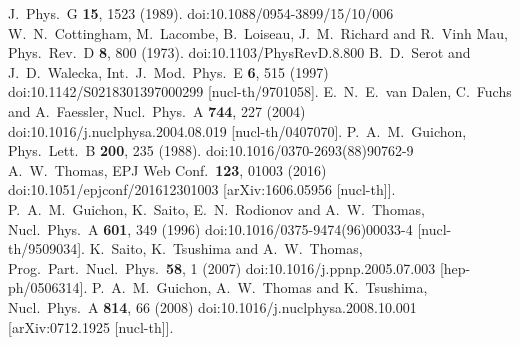 \documentclass{ws-ijmpe}
\begin{document}
\begin{thebibliography}{0}
  J.\ Phys.\ G {\bf 15}, 1523 (1989).
  doi:10.1088/0954-3899/15/10/006
%
  W.~N.~Cottingham, M.~Lacombe, B.~Loiseau, J.~M.~Richard and R.~Vinh Mau,
  Phys.\ Rev.\ D {\bf 8}, 800 (1973).
  doi:10.1103/PhysRevD.8.800
%
  B.~D.~Serot and J.~D.~Walecka,
  Int.\ J.\ Mod.\ Phys.\ E {\bf 6}, 515 (1997)
  doi:10.1142/S0218301397000299
  [nucl-th/9701058].
%
  E.~N.~E.~van Dalen, C.~Fuchs and A.~Faessler,
  Nucl.\ Phys.\ A {\bf 744}, 227 (2004)
  doi:10.1016/j.nuclphysa.2004.08.019
  [nucl-th/0407070].
%
  P.~A.~M.~Guichon,
  Phys.\ Lett.\ B {\bf 200}, 235 (1988).
  doi:10.1016/0370-2693(88)90762-9
%
  A.~W.~Thomas,
  EPJ Web Conf.\  {\bf 123}, 01003 (2016)
  doi:10.1051/epjconf/201612301003
  [arXiv:1606.05956 [nucl-th]].
%
  P.~A.~M.~Guichon, K.~Saito, E.~N.~Rodionov and A.~W.~Thomas,
  Nucl.\ Phys.\ A {\bf 601}, 349 (1996)
  doi:10.1016/0375-9474(96)00033-4
  [nucl-th/9509034].
%
  K.~Saito, K.~Tsushima and A.~W.~Thomas,
  Prog.\ Part.\ Nucl.\ Phys.\  {\bf 58}, 1 (2007)
  doi:10.1016/j.ppnp.2005.07.003
  [hep-ph/0506314].
%
  P.~A.~M.~Guichon, A.~W.~Thomas and K.~Tsushima,
  Nucl.\ Phys.\ A {\bf 814}, 66 (2008)
  doi:10.1016/j.nuclphysa.2008.10.001
  [arXiv:0712.1925 [nucl-th]].
%

\end{thebibliography}
\end{document}
